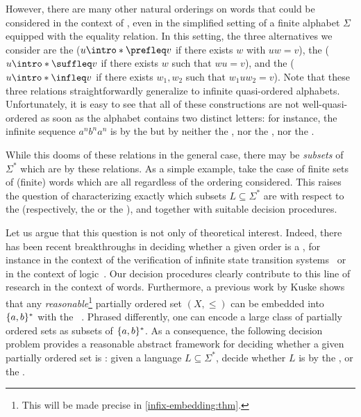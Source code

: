 \AP However, there are many other natural orderings on words that could be
considered in the context of , even in the simplified
setting of a finite alphabet $\Sigma$ equipped with the equality relation. In
this setting, the three alternatives we consider are the  ($u \intro*\prefleq v$ if there exists $w$ with $uw = v$), the
 ($u \intro*\suffleq v$ if there exists $w$ such that
$wu = v$), and the  ($u \intro*\infleq v$ if there exists
$w_1,w_2$ such that $w_1 u w_2 = v$). Note that these three relations
straightforwardly generalize to infinite quasi-ordered alphabets.
Unfortunately, it is easy to see that all of these constructions are not
well-quasi-ordered as soon as the alphabet contains two distinct letters:
for instance, the infinite sequence $a^n b^n a^n$ is  by
the  but by neither the , nor the
, nor the .

\AP While this dooms  of these
relations in the general case, there may be \emph{subsets} of $\Sigma^*$ which
are  by these relations. As a simple example, take the
case of finite sets of (finite) words which are all 
regardless of the ordering considered. This raises the question of
characterizing exactly which subsets $L \subseteq \Sigma^*$ are
 with respect to the  (respectively,
the  or the ), and together with
suitable decision procedures.

\AP Let us argue that this question is not only of theoretical interest.
Indeed, there has been recent breakthroughs in deciding whether a given order
is a , for instance in the context of the verification of
infinite state transition systems~\cite{DBLP:conf/fsttcs/FinkelG19} or in the
context of logic~\cite{DBLP:journals/pacmpl/BergstrasserGLZ24}. Our decision
procedures clearly contribute to this line of research in the context of words.
Furthermore, a previous work by Kuske shows that any
\emph{reasonable}\footnote{ This will be made precise in
\cref{infix-embedding:thm}. } partially ordered set $(X, \leq)$ can
be embedded into $\{ a,b \}^*$ with the ~\cite[Lemma
5.1]{DBLP:journals/ita/Kuske06}. Phrased differently, one can encode a large
class of partially ordered sets as subsets of $\{ a,b \}^*$. As a consequence,
the following decision problem provides a reasonable abstract framework for
deciding whether a given partially ordered set is :
given a language $L \subseteq \Sigma^*$, decide whether $L$ is
 by the , or the .

